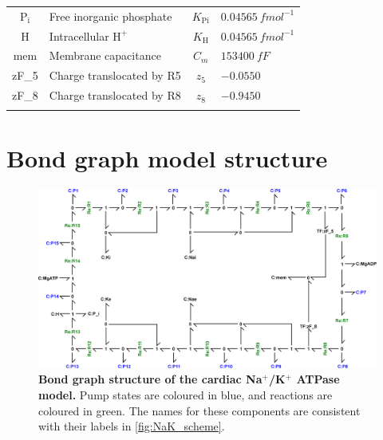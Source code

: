 \documentclass[fleqn,10pt]{physiome}
\begin{document}
\begin{table}[H]
\begin{tabular}{cl c l}
		$\text{P}_\text{i}$ & Free inorganic phosphate & $K_\text{Pi}$ & $0.04565\ \si{fmol^{-1}}$ \\ 
		H & Intracellular $\text{H}^+$ & $K_\text{H}$ & $0.04565\ \si{fmol^{-1}}$ \\ 
		mem & Membrane capacitance & $C_m$ & $153400\ \si{fF}$ \\
		zF{\_}5 & Charge translocated by R5 & $z_5$ & $-0.0550$ \\
		zF{\_}8 & Charge translocated by R8 & $z_8$ & $-0.9450$ \\ \bottomrule& & 
	\end{tabular}
	\label{tab:bg_parameters}
\end{table}

\newpage
\section{Bond graph model structure}
\label{sec:BG_structure}
\begin{figure}[H]
	\centering
	\includegraphics[width=\linewidth]{Terkildsen_NaK_BG_full.eps}
	\caption{\textbf{Bond graph structure of the cardiac Na$^+$/K$^+$ ATPase model.} Pump states are coloured in blue, and reactions are coloured in green. The names for these components are consistent with their labels in \autoref{fig:NaK_scheme}.}
	\label{fig:Terkildsen_NaK}
\end{figure}
\end{document}
